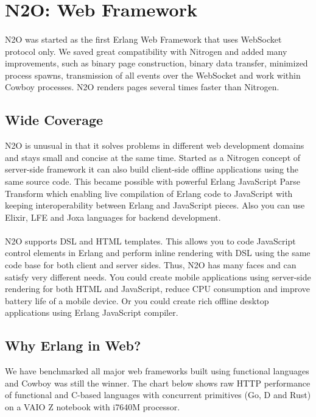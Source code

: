 \section{N2O: Web Framework}

\paragraph{}
N2O was started as the first Erlang Web Framework
that uses WebSocket protocol only. We saved great compatibility with Nitrogen
and added many improvements, such as binary page construction,
binary data transfer, minimized process spawns, transmission of all events over the WebSocket
and work within Cowboy processes. N2O renders pages several times faster than Nitrogen.

\subsection{Wide Coverage}
N2O is unusual in that it solves problems in different web development domains
and stays small and concise at the same time. Started as a Nitrogen concept
of server-side framework it can also build client-side offline applications
using the same source code. This became possible with powerful Erlang JavaScript Parse
Transform which enabling live compilation of Erlang code to JavaScript with keeping 
interoperability between Erlang and JavaScript pieces. Also you can use Elixir, LFE and Joxa languages for backend development.

\paragraph{}
N2O supports DSL and HTML templates. This allows you to code JavaScript
control elements in Erlang and perform inline rendering with DSL using
the same code base for both client and server sides.
Thus, N2O has many faces and can  satisfy very different needs. You could create mobile applications using server-side rendering
for both HTML and JavaScript, reduce CPU consumption and improve battery life of a mobile device.
Or you could create rich offline desktop applications using Erlang JavaScript compiler.

\newpage
\subsection*{Why Erlang in Web?}
We have benchmarked all major web frameworks built using functional
languages and Cowboy was still the winner. The chart below shows raw HTTP
performance of functional and C-based languages with concurrent
primitives (Go, D and Rust) on a VAIO Z notebook with i7640M processor.

